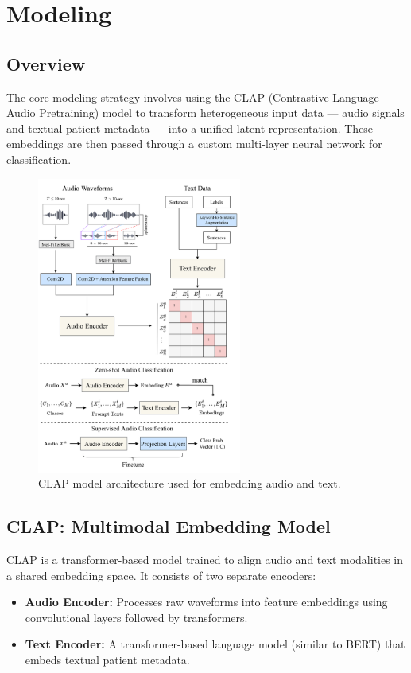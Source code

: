 \break
\section{Modeling}

\subsection*{Overview}
The core modeling strategy involves using the CLAP (Contrastive Language-Audio Pretraining) model to transform heterogeneous input data — audio signals and textual patient metadata — into a unified latent representation. These embeddings are then passed through a custom multi-layer neural network for classification.

\begin{figure}[H]
    \centering
    \includegraphics[width=0.6\textwidth]{Chapter4/audioclip-arch.png}
    \caption{CLAP model architecture used for embedding audio and text.}
    \label{fig:clap-model}
\end{figure}

\subsection{CLAP: Multimodal Embedding Model}
CLAP is a transformer-based model trained to align audio and text modalities in a shared embedding space. It consists of two separate encoders:
\begin{itemize}
    \item \textbf{Audio Encoder:} Processes raw waveforms into feature embeddings using convolutional layers followed by transformers.
    \item \textbf{Text Encoder:} A transformer-based language model (similar to BERT) that embeds textual patient metadata.
\end{itemize}

